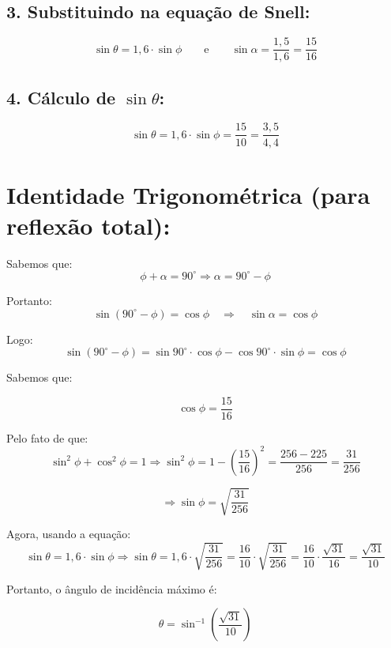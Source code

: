 \begin{flushleft}
\subsection*{3. Substituindo na equação de Snell:}
\[
\sin \theta = 1{,}6 \cdot \sin \phi
\qquad
\text{e}
\qquad
\sin \alpha = \frac{1{,}5}{1{,}6} = \frac{15}{16}
\]

\subsection*{4. Cálculo de $\sin \theta$:}
\[
\sin \theta = 1{,}6 \cdot \sin \phi = \frac{15}{10} = \frac{3{,}5}{4{,}4}
\]

\section*{Identidade Trigonométrica (para reflexão total):}

Sabemos que:
\[
\phi + \alpha = 90^\circ
\Rightarrow \alpha = 90^\circ - \phi
\]

Portanto:
\[
\sin (90^\circ - \phi) = \cos \phi
\quad \Rightarrow \quad
\sin \alpha = \cos \phi
\]

Logo:
\[
\sin(90^\circ - \phi) = \sin 90^\circ \cdot \cos \phi - \cos 90^\circ \cdot \sin \phi = \cos \phi
\]

Sabemos que:

\[
\cos \phi = \frac{15}{16}
\]

Pelo fato de que:
\[
\sin^2 \phi + \cos^2 \phi = 1
\Rightarrow \sin^2 \phi = 1 - \left(\frac{15}{16}\right)^2
= \frac{256 - 225}{256} = \frac{31}{256}
\]

\[
\Rightarrow \sin \phi = \sqrt{\frac{31}{256}}
\]

Agora, usando a equação:
\[
\sin \theta = 1{,}6 \cdot \sin \phi
\Rightarrow \sin \theta = 1{,}6 \cdot \sqrt{\frac{31}{256}}
= \frac{16}{10} \cdot \sqrt{\frac{31}{256}}
= \frac{16}{10} \cdot \frac{\sqrt{31}}{16}
= \frac{\sqrt{31}}{10}
\]

Portanto, o ângulo de incidência máximo é:

\[
\boxed{
\theta = \sin^{-1} \left( \frac{\sqrt{31}}{10} \right)
}
\]

\end{flushleft}


